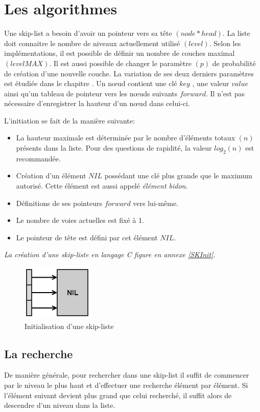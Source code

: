 \documentclass[hidelinks,a4paper, 12pt]{article}
\begin{document}
	\newpage
	\section{Les algorithmes}
	Une skip-list a besoin d'avoir un pointeur vers sa tête $(node* head)$. La liste doit connaitre le nombre de niveaux actuellement utilisé $(level)$. Selon les implémentations, il est possible de définir un nombre de couches maximal $(levelMAX)$. Il est aussi possible de changer le paramètre $(p)$ de probabilité de création d'une nouvelle couche. La variation de ses deux derniers paramètres est étudiée dans le chapitre .
	Un nœud contient une clé $key$ , une valeur $value$ ainsi qu'un tableau de pointeur vers les nœuds suivants $forward$. Il n'est pas nécessaire d'enregistrer la hauteur d'un nœud dans celui-ci.
	
	
	L'initiation se fait de la manière suivante:
	\begin{itemize}
		\item La hauteur maximale est déterminée par le nombre d'éléments totaux $(n)$ présents dans la liste. Pour des questions de rapidité, la valeur $log_2(n)$ est recommandée.
		\item Création d'un élément $NIL$ possédant une clé plus grande que le maximum autorisé. Cette élément est aussi appelé \textit{élément bidon}.
		\item Définitions de ses pointeurs $forward$ vers lui-même.
		\item Le nombre de voies actuelles est fixé à 1.
		\item Le pointeur de tête est défini par cet élément $NIL$.
	\end{itemize}
	\emph{La création d'une skip-liste en langage C figure en annexe \ref{SKInit}.}
	
	\begin{figure}[h]
		\includegraphics{img/init}
		\caption{Initialisation d'une skip-liste}
		\label{SkipInit}
	\end{figure}
	
	\newpage
	\subsection{La recherche}
	De manière générale, pour rechercher dans une skip-list il suffit de commencer par le niveau le plus haut et d'effectuer une recherche élément par élément. Si l'élément suivant devient plus grand que celui recherché, il suffit alors de descendre d'un niveau dans la liste.
	
\end{document}
